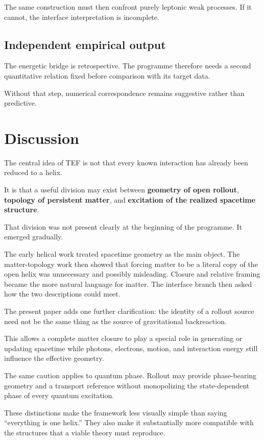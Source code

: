 \documentclass[10pt]{article}
\begin{document}
The same construction must then confront purely leptonic weak processes. If it cannot, the interface interpretation is incomplete.

\subsection{Independent empirical output}\label{independent-empirical-output}

The energetic bridge is retrospective. The programme therefore needs a second quantitative relation fixed before comparison with its target data.

Without that step, numerical correspondence remains suggestive rather than predictive.

\section{Discussion}\label{discussion}

The central idea of TEF is not that every known interaction has already been reduced to a helix.

It is that a useful division may exist between \textbf{geometry of open rollout}, \textbf{topology of persistent matter}, and \textbf{excitation of the realized spacetime structure}.

That division was not present clearly at the beginning of the programme. It emerged gradually.

The early helical work treated spacetime geometry as the main object. The matter-topology work then showed that forcing matter to be a literal copy of the open helix was unnecessary and possibly misleading. Closure and relative framing became the more natural language for matter. The interface branch then asked how the two descriptions could meet.

The present paper adds one further clarification: the identity of a rollout source need not be the same thing as the source of gravitational backreaction.

This allows a complete matter closure to play a special role in generating or updating spacetime while photons, electrons, motion, and interaction energy still influence the effective geometry.

The same caution applies to quantum phase. Rollout may provide phase-bearing geometry and a transport reference without monopolizing the state-dependent phase of every quantum excitation.

These distinctions make the framework less visually simple than saying ``everything is one helix.'' They also make it substantially more compatible with the structures that a viable theory must reproduce.
\end{document}

